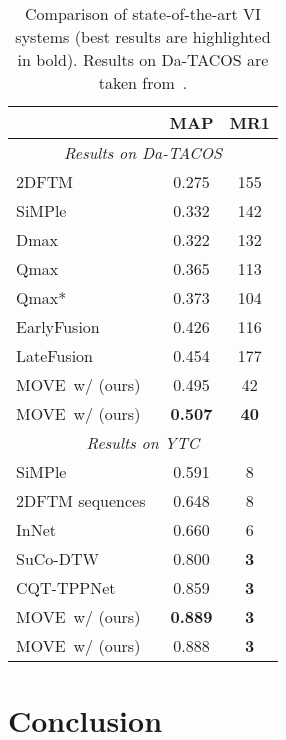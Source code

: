 \documentclass[letterpaper]{article}
\newcommand{\modelname}{MOVE}
\newcommand{\tabspace}{\vspace{-5mm}}
\begin{document}
\begin{table}[tb!]
\setlength\tabcolsep{12pt}
\begin{center}
\label{tab:sota}
\begin{tabular}{l c c}
\hline\hline
 & MAP &  MR1\\
\hline\hline

\multicolumn{3}{c}{\textit{Results on Da-TACOS}}\\

2DFTM~\cite{bertin2012}  & 0.275  & 155 \\

SiMPle~\cite{silva2016}  &  0.332 &  142\\

Dmax~\cite{chen2018}  & 0.322 & 132 \\

Qmax~\cite{serra2009}  & 0.365   & 113  \\

Qmax*~\cite{serra2009unsupervised}  &  0.373 & 104 \\

EarlyFusion~\cite{tralie2017cover}  & 0.426  &   116 \\

LateFusion~\cite{chen2018}  & 0.454  &   177 \\

\modelname\ w/  (ours) &  0.495 & 42 \\ 

\modelname\ w/  (ours) & \textbf{0.507} & \textbf{40} \\ \hline \multicolumn{3}{c}{\textit{Results on YTC}} \\ 


SiMPle~\cite{silva2016}  &  0.591   & 8 \\

2DFTM sequences~\cite{seetharaman2017}  & 0.648    &  8 \\

InNet~\cite{xu2018}  & 0.660  &  6 \\

SuCo-DTW~\cite{silva2018}  & 0.800  & \textbf{3} \\

CQT-TPPNet~\cite{yu2019}  & 0.859    & \textbf{3} \\

\modelname\ w/  (ours) &  \textbf{0.889} & \textbf{3} \\ 

\modelname\ w/  (ours) & 0.888 & \textbf{3} \\ \hline\hline
\end{tabular}
\caption{Comparison of state-of-the-art VI systems (best results are highlighted in bold). Results on Da-TACOS are taken from~\cite{yesiler2019}.}\label{tab:sota}
\end{center}
\tabspace
\vspace{-1mm}
\end{table} \section{Conclusion}
\end{document}
